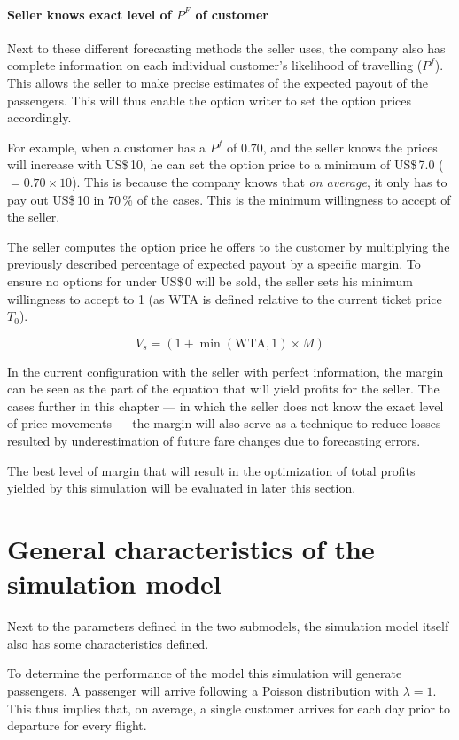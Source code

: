 \paragraph{Seller knows exact level of $P^F$ of customer}
Next to these different forecasting methods the seller uses, the company also has complete information on each individual customer's likelihood of travelling ($P^f$). This allows the seller to make precise estimates of the expected payout of the passengers. This will thus enable the option writer to set the option prices accordingly.

For example, when a customer has a $P^f$ of $0.70$, and the seller knows the prices will increase with US\$\,10, he can set the option price to a minimum of US\$\,7.0 ($= 0.70 \times 10$). This is because the company knows that \emph{on average}, it only has to pay out US\$\,10 in $70\,\%$ of the cases. This is the minimum willingness to accept of the seller.

The seller computes the option price he offers to the customer by multiplying the previously described percentage of expected payout by a specific margin. To ensure no options for under US\$\,0 will be sold, the seller sets his minimum willingness to accept to 1 (as WTA is defined relative to the current ticket price $T_0$).

$$ V_s = (1 + \min(\mbox{WTA}, 1) \times M) $$

In the current configuration with the seller with perfect information, the margin can be seen as the part of the equation that will yield profits for the seller. The cases further in this chapter --- in which the seller does not know the exact level of price movements --- the margin will also serve as a technique to reduce losses resulted by underestimation of future fare changes due to forecasting errors.

The best level of margin that will result in the optimization of total profits yielded by this simulation will be evaluated in later this section.



\section{General characteristics of the simulation model}
Next to the parameters defined in the two submodels, the simulation model itself also has some characteristics defined.

To determine the performance of the model this simulation will generate passengers. A passenger will arrive following a Poisson distribution with $\lambda = 1$. This thus implies that, on average, a single customer arrives for each day prior to departure for every flight.

